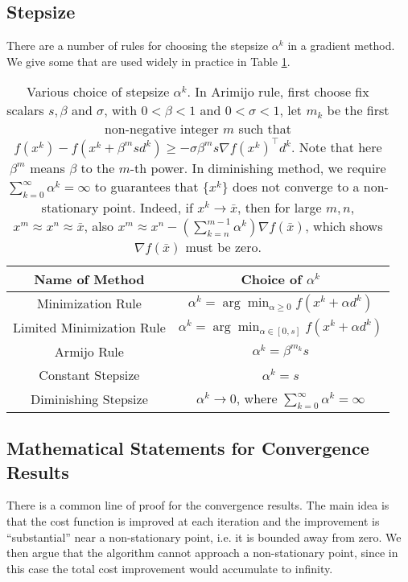 \documentclass[12pt,a4paper]{report}
\numberwithin{equation}{section}
\theoremstyle{mystyle}
\newcommand{\grad}{\nabla}
\newcommand{\T}{\top}
\begin{document}
	\subsection{Stepsize}
	There are a number of rules for choosing the stepsize $\alpha^k$ in a gradient method. We give some that are used widely in practice in Table \ref{table:stepsize}.
	\begin{table}[]
		\centering
		\begin{tabular}{@{}cc@{}}
			\toprule
			Name of Method            & Choice of $\alpha^k$                                       \\ \midrule
			Minimization Rule         & $\alpha^k = \arg\min_{\alpha\geq 0} f(x^k+\alpha d^k)$     \\
			Limited Minimization Rule & $\alpha^k = \arg\min_{\alpha\in [0,s]} f(x^k+\alpha d^k)$  \\
			Armijo Rule               & $\alpha^k=\beta^{m_k}s$                                    \\
			Constant Stepsize         & $\alpha^k =s$                                              \\
			Diminishing Stepsize      & $\alpha^k\to 0$, where $\sum_{k=0}^\infty \alpha^k=\infty$ \\ \bottomrule
		\end{tabular}
	\caption{Various choice of stepsize $\alpha^k$. In Arimijo rule, first choose fix scalars $s,\beta$ and $\sigma$, with $0<\beta<1$ and $0<\sigma<1$, let $m_k$ be the first non-negative integer $m$ such that $f(x^k)-f(x^k+\beta^m s d^k)\geq -\sigma \beta^m s \grad f(x^k)^\T d^k$. Note that here $\beta^m$ means $\beta$ to the $m$-th power. In diminishing method, we require $\sum_{k=0}^{\infty}\alpha^k=\infty$ to guarantees that $\{x^k\}$ does not converge to a non-stationary point. Indeed, if $x^k\to\bar{x}$, then for large $m,n$, $x^m\approx x^n \approx \bar{x}$, also $x^m\approx x^n -(\sum_{k=n}^{m-1}\alpha^k)\grad f(\bar{x})$, which shows $\grad f(\bar{x})$ must be zero.}
	\label{table:stepsize}
	\end{table}
	
	
	
	\subsection{Mathematical Statements for Convergence Results}
	There is a common line of proof for the convergence results. The main idea is that the cost function is improved at each iteration and the improvement is ``substantial'' near a non-stationary point, i.e. it is bounded away from zero. We then argue that the algorithm cannot approach a non-stationary point, since in this case the total cost improvement would accumulate to infinity.
	
\end{document}
